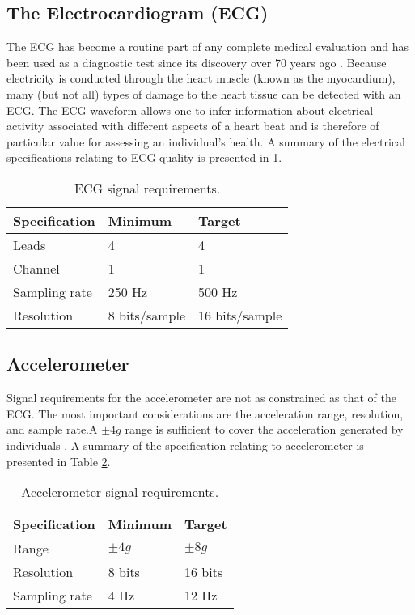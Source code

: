 \subsection{The Electrocardiogram (ECG)}
The ECG has become a routine part of any complete medical evaluation and has been used as a diagnostic 
test since its discovery over 70 years ago \cite{ecg}. Because electricity is conducted through 
the heart muscle (known as the myocardium), many (but not all) types of damage 
to the heart tissue can be detected with an ECG. The ECG waveform allows one to 
infer information about electrical activity associated with different aspects of a heart 
beat and is therefore of particular value for assessing an individual's health. A summary of the electrical specifications relating to ECG quality is presented in \ref{table:ecg}.

\begin{table}
  \centering
  \begin{tabular}{|l|l|l|}
    \hline
    Specification & Minimum & Target \\
    \hline
    Leads & 4 & 4 \\
    Channel & 1 & 1 \\
    Sampling rate & 250 Hz & 500 Hz \\
    Resolution & 8 bits/sample & 16 bits/sample \\
    \hline
  \end{tabular}
  \caption{ECG signal requirements.}
  \label{table:ecg}
\end{table}

\subsection{Accelerometer}
Signal requirements for the accelerometer are not as constrained as that of the ECG. The most important considerations are the acceleration range, resolution, and sample rate.A $\pm 4g$ range is sufficient to cover the acceleration generated by individuals \cite{wearable_ecg}. A summary of the specification relating to accelerometer is presented in Table \ref{table:acc}.
\begin{table}[h]
	\centering
	\begin{tabular}{|l |l|l|}
		\hline
		Specification & Minimum & Target \\
		\hline
		Range & $\pm 4g$ & $\pm 8g$ \\
		Resolution & 8 bits & 16 bits\\
		Sampling rate & 4 Hz & 12 Hz \\
		\hline
	\end{tabular}
	\caption{Accelerometer signal requirements.}
	\label{table:acc}
\end{table}

